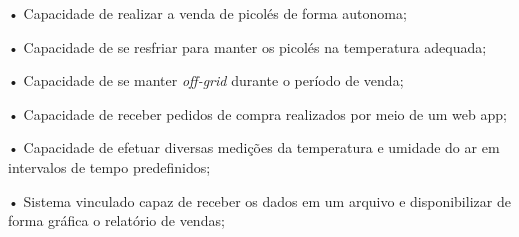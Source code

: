 • Capacidade de realizar a venda de picolés de forma autonoma;

• Capacidade de se resfriar para manter os picolés na temperatura adequada;

• Capacidade de se manter \textit{off-grid} durante o período de venda;

• Capacidade de receber pedidos de compra realizados por meio de um web app;

• Capacidade de efetuar diversas medições da temperatura e umidade do ar em intervalos de tempo predefinidos;

• Sistema vinculado capaz de receber os dados em um arquivo e disponibilizar de forma gráfica o relatório de vendas;
